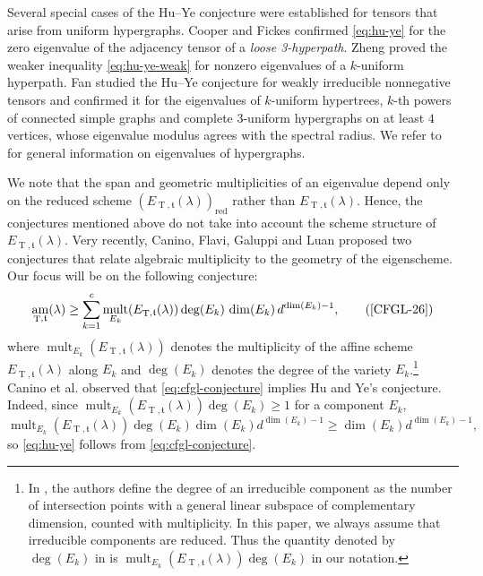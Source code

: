 \documentclass[11pt,letterpaper]{article}
\numberwithin{equation}{section}
\newcommand{\ft}{\mathfrak{t}}
\DeclareMathOperator{\am}{am}
\DeclareMathOperator{\T}{T}
\DeclareMathOperator{\mult}{mult}
\DeclareMathOperator{\red}{red}
\begin{document}
Several special cases of the Hu--Ye conjecture were established for tensors that arise from uniform hypergraphs.
Cooper and Fickes \cite{Cooper-Fickes-22} confirmed \eqref{eq:hu-ye} for the zero eigenvalue of the adjacency tensor of a \emph{loose 3-hyperpath}.
Zheng \cite{Zheng-24} proved the weaker inequality \eqref{eq:hu-ye-weak} for nonzero eigenvalues of a $k$-uniform hyperpath.
Fan \cite{Fan-26} studied the Hu--Ye conjecture for weakly irreducible nonnegative tensors and confirmed it for the eigenvalues of $k$-uniform hypertrees, $k$-th powers of connected simple graphs and complete $3$-uniform hypergraphs on at least $4$ vertices, whose eigenvalue modulus agrees with the spectral radius.
We refer to \cite{Cooper-Dutle-12} for general information on eigenvalues of hypergraphs.

We note that the span and geometric multiplicities of an eigenvalue depend only on the reduced scheme $\left(E_{\T,\ft}(\lambda)\right)_{\red}$ rather than $E_{\T,\ft}(\lambda)$.
Hence, the conjectures mentioned above do not take into account the scheme structure of $E_{\T,\ft}(\lambda)$.
Very recently, Canino, Flavi, Galuppi and Luan \cite{CFGL-26} proposed two conjectures that relate algebraic multiplicity to the geometry of the eigenscheme.
Our focus will be on the following conjecture: 
\begin{equation}
\label{eq:cfgl-conjecture}
\am_{\T,\ft}(\lambda)\geq \sum_{k=1}^c \mult_{E_k}(E_{\T,\ft}(\lambda))\deg(E_k)\,\dim(E_k) \, d^{\dim(E_k) -1},\tag{\cite[Conjecture~1.5]{CFGL-26}}
\end{equation}
where $\mult_{E_k}(E_{\T,\ft}(\lambda))$ denotes the multiplicity of the affine scheme $E_{\T,\ft}(\lambda)$ along $E_k$ and $\deg(E_k)$ denotes the degree of the variety $E_k$.\footnote{In \cite{CFGL-26}, the authors define the degree of an irreducible component as the number of intersection points with a general linear subspace of complementary dimension, counted with multiplicity. 
In this paper, we always assume that irreducible components are reduced. Thus the quantity denoted by $\deg(E_k)$ in \cite{CFGL-26} is $\mult_{E_k}(E_{\T,\ft}(\lambda)) \deg(E_k)$ in our notation.}
Canino et al. observed that \eqref{eq:cfgl-conjecture} implies Hu and Ye's conjecture.
Indeed, since $\mult_{E_k}(E_{\T,\ft}(\lambda))\deg(E_k)\geq 1$ for a component $E_k$, \[
\mult_{E_k}(E_{\T,\ft}(\lambda))\deg(E_k)\dim(E_k)d^{\dim(E_k)-1}\geq \dim (E_k) d^{\dim(E_k) -1},
\] so \eqref{eq:hu-ye} follows from \eqref{eq:cfgl-conjecture}.
\end{document}
